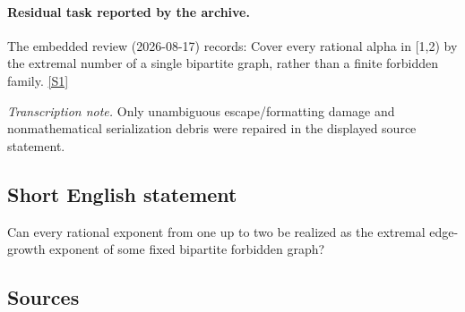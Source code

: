 \documentclass[11pt,a4paper]{article}
\newcommand{\sref}[2]{\hyperlink{source:#1:#2}{[S#2]}}
\begin{document}
\paragraph{Residual task reported by the archive.}

The embedded review (2026-08-17) records: Cover every rational alpha in [1,2) by the extremal number of a single bipartite graph, rather than a finite forbidden family. \sref{2186}{1}

{\small\emph{Transcription note.} Only unambiguous escape/formatting damage and nonmathematical serialization debris were repaired in the displayed source statement.}

\subsection{Short English statement}

Can every rational exponent from one up to two be realized as the extremal edge-growth exponent of some fixed bipartite forbidden graph?

\subsection{Sources}
\end{document}
